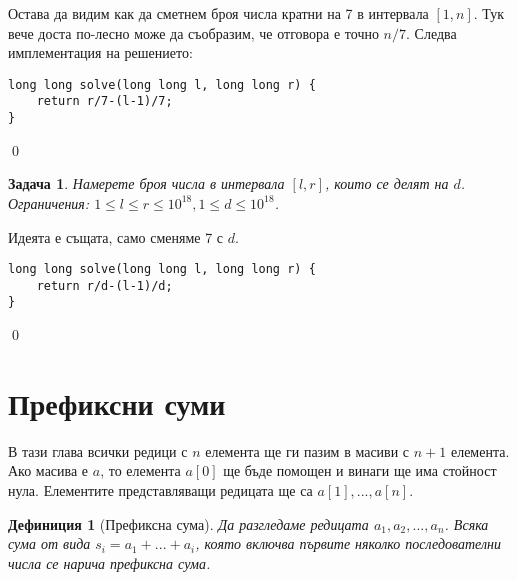 \documentclass[]{article}
\newtheorem{problem}{Задача}
\newtheorem{definition}{Дефиниция}
\newenvironment{solution}{\noindent{\bf Решение.}\hspace*{1em}}{\qed\par}
\begin{document}
\begin{solution}
Остава да видим как да сметнем броя числа кратни на 7 в интервала $[1, n]$. Тук вече доста по-лесно може да съобразим, че отговора е точно $n/7$.\newline
Следва имплементация на решението:
\begin{verbatim}
long long solve(long long l, long long r) {
    return r/7-(l-1)/7;
}
\end{verbatim}
\end{solution}
\begin{problem}
Намерете броя числа в интервала $[l, r]$, които се делят на $d$.\newline
Ограничения: $1\leq l\leq r\leq 10^{18},1\leq d\leq 10^{18}$.
\end{problem}
\begin{solution}
Идеята е същата, само сменяме 7 с $d$.
\begin{verbatim}
long long solve(long long l, long long r) {
    return r/d-(l-1)/d;
}
\end{verbatim}
\end{solution}

\section{Префиксни суми}

В тази глава всички редици с $n$ елемента ще ги пазим в масиви с $n+1$ елемента. Ако масива е $a$, то елемента $a[0]$ ще бъде помощен и винаги ще има стойност нула. Елементите представляващи редицата ще са $a[1],...,a[n]$.

\begin{definition}[Префиксна сума]
Да разгледаме редицата $a_1,a_2,...,a_n$. Всяка сума от вида $s_i=a_1+...+a_i$, която включва първите няколко последователни числа се нарича префиксна сума.
\end{definition}
\end{document}
